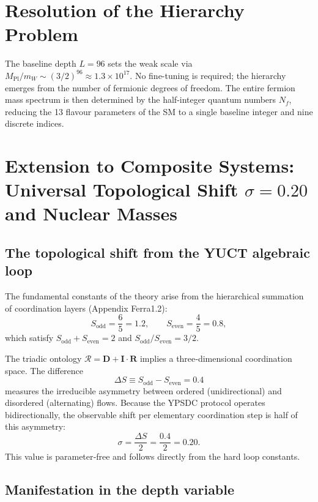 \documentclass[12pt,a4paper]{article}
\begin{document}
	\section{Resolution of the Hierarchy Problem}
	
	The baseline depth $L=96$ sets the weak scale via $M_{\mathrm{Pl}}/m_W \sim (3/2)^{96} \approx 1.3\times10^{17}$. No fine-tuning is required; the hierarchy emerges from the number of fermionic degrees of freedom. The entire fermion mass spectrum is then determined by the half-integer quantum numbers $N_f$, reducing the 13 flavour parameters of the SM to a single baseline integer and nine discrete indices.
	
\section{Extension to Composite Systems: Universal Topological Shift \(\sigma=0.20\) and Nuclear Masses}
\label{sec:sigma_nuclear}

\subsection{The topological shift from the YUCT algebraic loop}

The fundamental constants of the theory arise from the hierarchical summation of coordination layers (Appendix Ferra1.2):
\[
S_{\mathrm{odd}} = \frac{6}{5}=1.2,\qquad S_{\mathrm{even}} = \frac{4}{5}=0.8,
\]
which satisfy \(S_{\mathrm{odd}}+S_{\mathrm{even}}=2\) and \(S_{\mathrm{odd}}/S_{\mathrm{even}}=3/2\).

The triadic ontology \(\mathcal{R} = \mathbf{D} + \mathbf{I}\!\cdot\!\mathbf{R}\) implies a three‑dimensional coordination space. The difference
\[
\Delta S \equiv S_{\mathrm{odd}} - S_{\mathrm{even}} = 0.4
\]
measures the irreducible asymmetry between ordered (unidirectional) and disordered (alternating) flows. Because the YPSDC protocol operates bidirectionally, the observable shift per elementary coordination step is half of this asymmetry:
\begin{equation}
	\boxed{\sigma = \frac{\Delta S}{2} = \frac{0.4}{2} = 0.20.}
	\label{eq:sigma_fermion_paper}
\end{equation}
This value is parameter‑free and follows directly from the hard loop constants.

\subsection{Manifestation in the depth variable}
\end{document}
